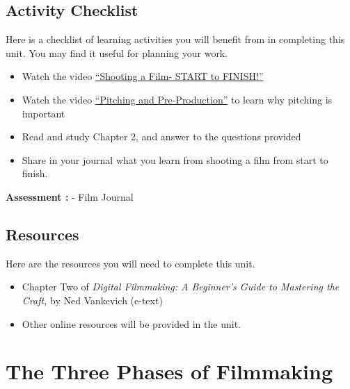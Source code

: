 \documentclass[
]{book}
\providecommand{\tightlist}{%
  \setlength{\itemsep}{0pt}\setlength{\parskip}{0pt}}
\begin{document}
\hypertarget{activity-checklist-1}{%
\subsection*{Activity Checklist}\label{activity-checklist-1}}

\begin{reflect}
Here is a checklist of learning activities you will benefit from in completing this unit. You may find it useful for planning your work.

\begin{itemize}
\tightlist
\item
  Watch the video \href{https://www.youtube.com/watch?v=8NCLf9rF6IQ}{``Shooting a Film- START to FINISH!''}
\item
  Watch the video \href{https://www.youtube.com/watch?v=JE53JL60ihc}{``Pitching and Pre-Production''} to learn why pitching is important
\item
  Read and study Chapter 2, and answer to the questions provided
\item
  Share in your journal what you learn from shooting a film from start to finish.
\end{itemize}

\textbf{Assessment :}
- Film Journal
\end{reflect}

\hypertarget{resources-1}{%
\subsection*{Resources}\label{resources-1}}

Here are the resources you will need to complete this unit.

\begin{itemize}
\tightlist
\item
  Chapter Two of \emph{Digital Filmmaking: A Beginner's Guide to Mastering the Craft,} by Ned Vankevich (e-text)
\item
  Other online resources will be provided in the unit.
\end{itemize}

\hypertarget{the-three-phases-of-filmmaking}{%
\section{The Three Phases of Filmmaking}\label{the-three-phases-of-filmmaking}}
\end{document}
